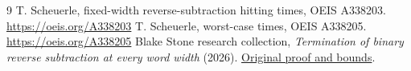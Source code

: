 \documentclass[11pt]{article}
\begin{document}
\begin{thebibliography}{9}
 T. Scheuerle, fixed-width reverse-subtraction hitting times, OEIS A338203. \url{https://oeis.org/A338203}
 T. Scheuerle, worst-case times, OEIS A338205. \url{https://oeis.org/A338205}
 Blake Stone research collection, \emph{Termination of binary reverse subtraction at every word width} (2026). \href{https://github.com/blakestone-x/math/blob/c18014b822980b0d6cb9b78fc228e5efda2718c6/A338203/manuscript.pdf}{Original proof and bounds}.
\end{thebibliography}
\end{document}
